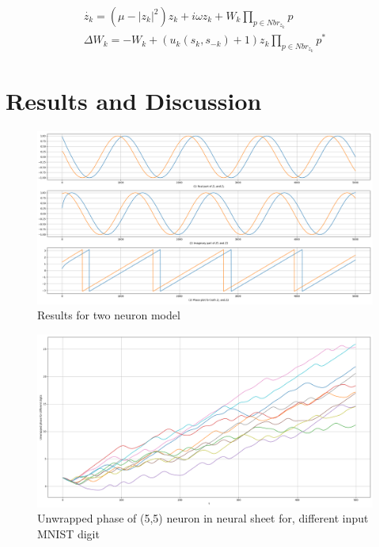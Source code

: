 \documentclass{article}
\begin{document}
\begin{subequations}
\label{eqn: multi_neuron}
\begin{align}
 \dot{z_k} = (\mu - |z_k|^2)z_k + i\omega z_k + W_k \prod_{p \in Nbr_{z_k}} p \\ 
 \Delta W_k = - W_k + (u_k(s_k, s_{-k}) + 1)z_k \prod_{p \in Nbr_{z_k}}p^*
\end{align}
\end{subequations}

\section{Results and Discussion}
\label{resdis}
\begin{figure}[h]
    \centering
    \includegraphics[width=1.\textwidth]{two_neuron_phase_potential.png}
    \caption{Results for two neuron model}
    \label{hist_exp}
\end{figure}

\begin{figure}[h]
    \centering
    \includegraphics[width=1.\textwidth]{mnist_phase.png}
    \caption{Unwrapped phase of (5,5) neuron in  neural sheet for, different input MNIST digit}
    \label{hist_exp}
\end{figure}
\end{document}

